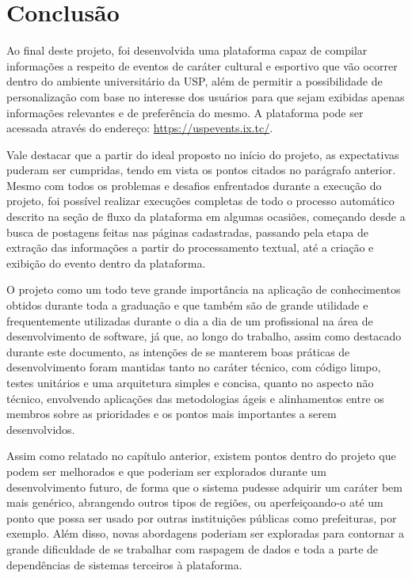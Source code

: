 
\chapter{Conclusão}

Ao final deste projeto, foi desenvolvida uma plataforma capaz de compilar
informações a respeito de eventos de caráter cultural e esportivo que vão
ocorrer dentro do ambiente universitário da USP, além de permitir a
possibilidade de personalização com base no interesse dos usuários para que
sejam exibidas apenas informações relevantes e de preferência do mesmo. A
plataforma pode ser acessada através do endereço:
\url{https://uspevents.ix.tc/}.

Vale destacar que a partir do ideal proposto no início do projeto, as
expectativas puderam ser cumpridas, tendo em vista os pontos citados no
parágrafo anterior. Mesmo com todos os problemas e desafios enfrentados durante
a execução do projeto, foi possível realizar execuções completas de todo o
processo automático descrito na seção de fluxo da plataforma em algumas
ocasiões, começando desde a busca de postagens feitas nas páginas cadastradas,
passando pela etapa de extração das informações a partir do processamento
textual, até a criação e exibição do evento dentro da plataforma.

O projeto como um todo teve grande importância na aplicação de conhecimentos
obtidos durante toda a graduação e que também são de grande utilidade e
frequentemente utilizadas durante o dia a dia de um profissional na área de
desenvolvimento de software, já que, ao longo do trabalho, assim como destacado
durante este documento, as intenções de se manterem boas práticas de
desenvolvimento foram mantidas tanto no caráter técnico, com código limpo,
testes unitários e uma arquitetura simples e concisa, quanto no aspecto não
técnico, envolvendo aplicações das metodologias ágeis e alinhamentos entre os
membros sobre as prioridades e os pontos mais importantes a serem
desenvolvidos.

Assim como relatado no capítulo anterior, existem pontos dentro do projeto que
podem ser melhorados e que poderiam ser explorados durante um desenvolvimento
futuro, de forma que o sistema pudesse adquirir um caráter bem mais genérico,
abrangendo outros tipos de regiões, ou aperfeiçoando-o até um ponto que possa
ser usado por outras instituições públicas como prefeituras, por exemplo. Além
disso, novas abordagens poderiam ser exploradas para contornar a grande
dificuldade de se trabalhar com raspagem de dados e toda a parte de
dependências de sistemas terceiros à plataforma.
